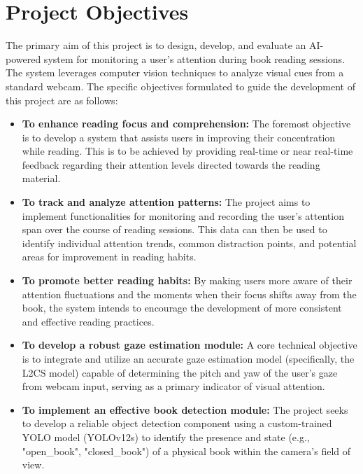 \section{Project Objectives}
The primary aim of this project is to design, develop, and evaluate an AI-powered system for monitoring a user's attention during book reading sessions. The system leverages computer vision techniques to analyze visual cues from a standard webcam. The specific objectives formulated to guide the development of this project are as follows:

\begin{itemize}
    \item \textbf{To enhance reading focus and comprehension:} The foremost objective is to develop a system that assists users in improving their concentration while reading. This is to be achieved by providing real-time or near real-time feedback regarding their attention levels directed towards the reading material.
    
    \item \textbf{To track and analyze attention patterns:} The project aims to implement functionalities for monitoring and recording the user's attention span over the course of reading sessions. This data can then be used to identify individual attention trends, common distraction points, and potential areas for improvement in reading habits.
    
    \item \textbf{To promote better reading habits:} By making users more aware of their attention fluctuations and the moments when their focus shifts away from the book, the system intends to encourage the development of more consistent and effective reading practices.
    
    \item \textbf{To develop a robust gaze estimation module:} A core technical objective is to integrate and utilize an accurate gaze estimation model (specifically, the L2CS model) capable of determining the pitch and yaw of the user's gaze from webcam input, serving as a primary indicator of visual attention.
    
    \item \textbf{To implement an effective book detection module:} The project seeks to develop a reliable object detection component using a custom-trained YOLO model (YOLOv12s) to identify the presence and state (e.g., "open\_book", "closed\_book") of a physical book within the camera's field of view.
    

\end{itemize}
